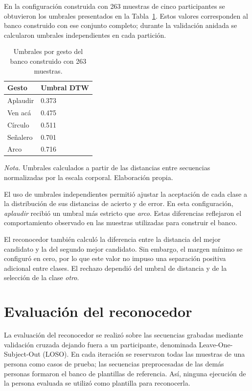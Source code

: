 En la configuración construida con 263 muestras de cinco participantes se obtuvieron los umbrales presentados en la Tabla~\ref{tab:drive_02}. Estos valores corresponden al banco construido con ese conjunto completo; durante la validación anidada se calcularon umbrales independientes en cada partición.

\begin{table}[htbp]
    \centering
    \caption{Umbrales por gesto del banco construido con 263 muestras.}
    \label{tab:drive_02}
    \begin{tabularx}{0.92\textwidth}{@{}lX@{}}
        \toprule
        Gesto & Umbral DTW \\
        \midrule
        Aplaudir & 0.373 \\
        Ven acá & 0.475 \\
        Círculo & 0.511 \\
        Señalero & 0.701 \\
        Arco & 0.716 \\
        \bottomrule
    \end{tabularx}

    \begin{minipage}{0.92\textwidth}
        \footnotesize
        \textit{Nota.} Umbrales calculados a partir de las distancias entre secuencias normalizadas por la escala corporal. Elaboración propia.
    \end{minipage}
\end{table}

El uso de umbrales independientes permitió ajustar la aceptación de cada clase a la distribución de sus distancias de acierto y de error. En esta configuración, \textit{aplaudir} recibió un umbral más estricto que \textit{arco}. Estas diferencias reflejaron el comportamiento observado en las muestras utilizadas para construir el banco.

El reconocedor también calculó la diferencia entre la distancia del mejor candidato y la del segundo mejor candidato. Sin embargo, el margen mínimo se configuró en cero, por lo que este valor no impuso una separación positiva adicional entre clases. El rechazo dependió del umbral de distancia y de la selección de la clase \textit{otro}.

\section{Evaluación del reconocedor}

La evaluación del reconocedor se realizó sobre las secuencias grabadas mediante validación cruzada dejando fuera a un participante, denominada Leave-One-Subject-Out (LOSO). En cada iteración se reservaron todas las muestras de una persona como casos de prueba; las secuencias preprocesadas de las demás personas formaron el banco de plantillas de referencia. Así, ninguna ejecución de la persona evaluada se utilizó como plantilla para reconocerla.

